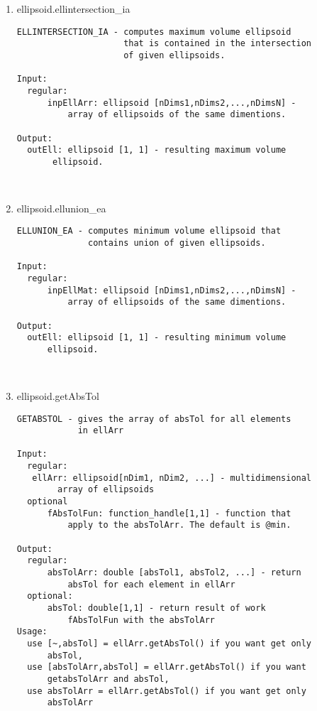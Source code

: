 \begin{enumerate}
\begin{lstlisting}
\end{lstlisting}
\fontfamily{\familydefault}
\selectfont
\item {ellipsoid.ellintersection\_ia}
\selectfont
\begin{lstlisting}
ELLINTERSECTION_IA - computes maximum volume ellipsoid
                     that is contained in the intersection
                     of given ellipsoids.

Input:
  regular:
      inpEllArr: ellipsoid [nDims1,nDims2,...,nDimsN] -
          array of ellipsoids of the same dimentions.

Output:
  outEll: ellipsoid [1, 1] - resulting maximum volume
       ellipsoid.



\end{lstlisting}
\fontfamily{\familydefault}
\selectfont
\item {ellipsoid.ellunion\_ea}
\selectfont
\begin{lstlisting}
ELLUNION_EA - computes minimum volume ellipsoid that
              contains union of given ellipsoids.

Input:
  regular:
      inpEllMat: ellipsoid [nDims1,nDims2,...,nDimsN] -
          array of ellipsoids of the same dimentions.

Output:
  outEll: ellipsoid [1, 1] - resulting minimum volume
      ellipsoid.



\end{lstlisting}
\fontfamily{\familydefault}
\selectfont
\item {ellipsoid.getAbsTol}
\selectfont
\begin{lstlisting}
GETABSTOL - gives the array of absTol for all elements
            in ellArr

Input:
  regular:
   ellArr: ellipsoid[nDim1, nDim2, ...] - multidimensional
        array of ellipsoids
  optional
      fAbsTolFun: function_handle[1,1] - function that
          apply to the absTolArr. The default is @min.

Output:
  regular:
      absTolArr: double [absTol1, absTol2, ...] - return
          absTol for each element in ellArr
  optional:
      absTol: double[1,1] - return result of work
          fAbsTolFun with the absTolArr
Usage:
  use [~,absTol] = ellArr.getAbsTol() if you want get only
      absTol,
  use [absTolArr,absTol] = ellArr.getAbsTol() if you want
      getabsTolArr and absTol,
  use absTolArr = ellArr.getAbsTol() if you want get only
      absTolArr




\end{lstlisting}
\end{enumerate}
